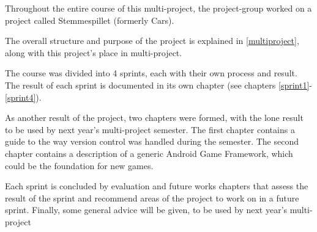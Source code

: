 Throughout the entire course of this multi-project, the project-group worked on a project called Stemmespillet (formerly Cars).

The overall structure and purpose of the project is explained in \cref{multiproject}, along with this project's place in multi-project.

The course was divided into 4 sprints, each with their own process and result.
The result of each sprint is documented in its own chapter (see chapters \ref{sprint1}-\ref{sprint4}).

As another result of the project, two chapters were formed, with the lone result to be used by next year's multi-project semester.
The first chapter contains a guide to the way version control was handled during the semester.
The second chapter contains a description of a generic Android Game Framework, which could be the foundation for new games.

Each sprint is concluded by evaluation and future works chapters that assess the result of the sprint and recommend areas of the project to work on in a future sprint.
Finally, some general advice will be given, to be used by next year's multi-project